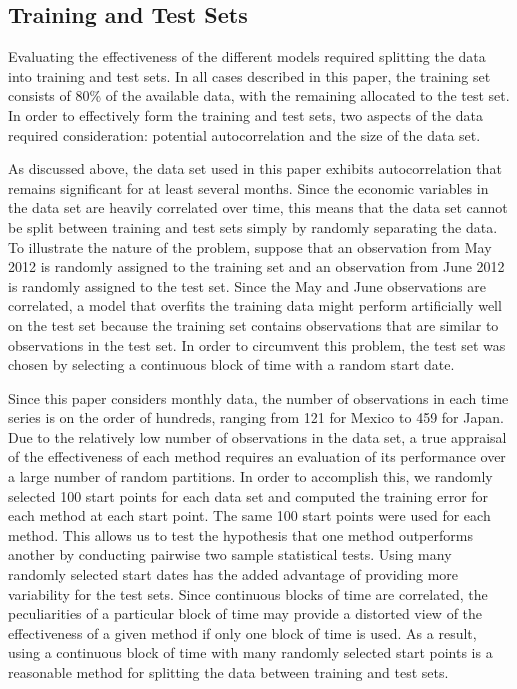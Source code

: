 \documentclass{sig-alternate-05-2015}
\begin{document}
\subsection{Training and Test Sets}
Evaluating the effectiveness of the different models required splitting the data into training and test sets. In all cases described in this paper, the training set consists of 80\% of the available data, with the remaining allocated to the test set. In order to effectively form the training and test sets, two aspects of the data required consideration: potential autocorrelation and the size of the data set.
\par{} As discussed above, the data set used in this paper exhibits autocorrelation that remains significant for at least several months. Since the economic variables in the data set are heavily correlated over time, this means that the data set cannot be split between training and test sets simply by randomly separating the data. To illustrate the nature of the problem, suppose that an observation from May 2012 is randomly assigned to the training set and an observation from June 2012 is randomly assigned to the test set. Since the May and June observations are correlated, a model that overfits the training data might perform artificially well on the test set because the training set contains observations that are similar to observations in the test set. In order to circumvent this problem, the test set was chosen by selecting a continuous block of time with a random start date.
\par{} Since this paper considers monthly data, the number of observations in each time series is on the order of hundreds, ranging from 121 for Mexico to 459 for Japan. Due to the relatively low number of observations in the data set, a true appraisal of the effectiveness of each method requires an evaluation of its performance over a large number of random partitions. In order to accomplish this, we randomly selected 100 start points for each data set and computed the training error for each method at each start point. The same 100 start points were used for each method. This allows us to test the hypothesis that one method outperforms another by conducting pairwise two sample statistical tests. Using many randomly selected start dates has the added advantage of providing more variability for the test sets. Since continuous blocks of time are correlated, the peculiarities of a particular block of time may provide a distorted view of the effectiveness of a given method if only one block of time is used. As a result, using a continuous block of time with many randomly selected start points is a reasonable method for splitting the data between training and test sets.
\end{document}
